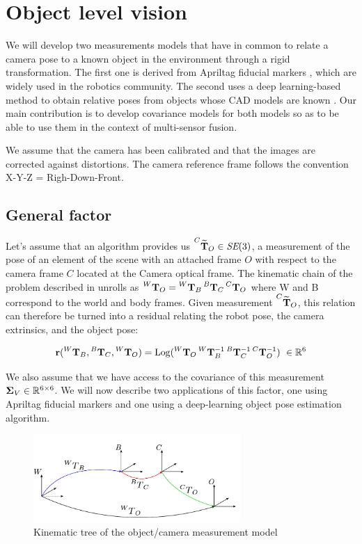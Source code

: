 \chapter{Object level vision}
\minitoc

We will develop two measurements models that have in common to relate a camera pose to a known object in the environment through a rigid transformation. The first one 
is derived from Apriltag fiducial markers \cite{wang2016iros}, which are widely used in the robotics community. The second uses a deep learning-based method
to obtain relative poses from objects whose CAD models are known \cite{labbe2020cosypose}. Our main contribution is to develop covariance models for both
models so as to be able to use them in the context of multi-sensor fusion.

We assume that the camera has been calibrated and that the images are corrected against distortions. The camera reference frame
follows the convention X-Y-Z = Righ-Down-Front.

\section{General factor}
Let's assume that an algorithm provides us $\prescript{C}{}{\widetilde{{\bf T}}}_{O} \in \textit{SE}(3)$, a measurement of the pose of an element 
of the scene with an attached frame $O$ with respect to the camera frame $C$ located at the Camera optical frame.
The kinematic chain of the problem described in  unrolls as 
$\prescript{W}{}{{\bf T}}_{O} = \prescript{W}{}{{\bf T}}_{B}\prescript{B}{}{{\bf T}}_{C}\prescript{C}{}{{\bf T}}_{O}$ where W and B correspond to the world and body frames.
Given measurement $\prescript{C}{}{\widetilde{{\bf T}}}_{O}$, this relation can therefore be turned into a residual relating 
the robot pose, the camera extrinsics, and the object pose:

\begin{equation}
    {\bf r} (\prescript{W}{}{{\bf T}}_{B}, \prescript{B}{}{{\bf T}}_{C}, \prescript{W}{}{{\bf T}}_{O}) = \operatorname*{Log}(\prescript{W}{}{{\bf T}}_{O} \prescript{W}{}{{\bf T}}_{B}^{-1} \prescript{B}{}{{\bf T}}_{C}^{-1} \prescript{C}{}{{\bf T}}_{O}^{-1}) ~ \in \mathbb{R}^6
\end{equation}

We also assume that we have access to the covariance of this measurement 
\mbox{${\bm \Sigma}_V \in \mathbb{R}^{6 \times 6}$}. We will now describe two applications of this factor, one using Apriltag fiducial markers and one using 
a deep-learning object pose estimation algorithm.

\begin{figure}
    \centering
    \includegraphics[width=0.7\textwidth]{figures/kin_tree_object.pdf}
    \caption{Kinematic tree of the object/camera measurement model}
    \label{fig:camera_object_chain}
\end{figure}


